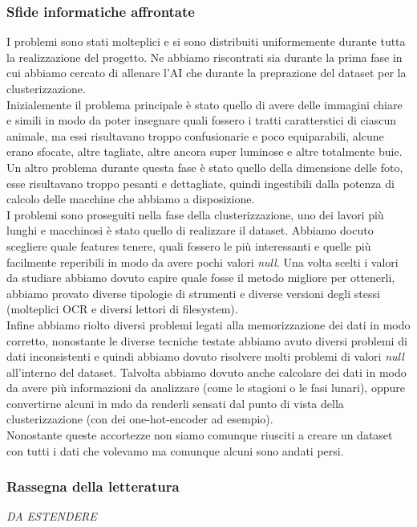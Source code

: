 \documentclass[12pt,a4paper,twoside]{article}
\begin{document}
\subsubsection{Sfide informatiche affrontate}
I problemi sono stati molteplici e si sono distribuiti uniformemente durante tutta la realizzazione del 
progetto. Ne abbiamo riscontrati sia durante la prima fase in cui abbiamo cercato di allenare l'AI che 
durante la preprazione del dataset per la clusterizzazione.\\
Inizialemente il problema principale è stato quello di avere delle immagini chiare e simili in modo da 
poter insegnare quali fossero i tratti caratterstici di ciascun animale, ma essi risultavano troppo 
confusionarie e poco equiparabili, alcune erano sfocate, altre tagliate, altre ancora super luminose e 
altre totalmente buie. Un altro problema durante questa fase è stato quello della dimensione delle foto, 
esse risultavano troppo pesanti e dettagliate, quindi ingestibili dalla potenza di calcolo delle macchine 
che abbiamo a disposizione.\\
I problemi sono proseguiti nella fase della clusterizzazione, uno dei lavori più lunghi e macchinosi è 
stato quello di realizzare il dataset. Abbiamo docuto scegliere quale features tenere, quali fossero le 
più interessanti e quelle più facilmente reperibili in modo da avere pochi valori \textit{null}. Una volta 
scelti i valori da studiare abbiamo dovuto capire quale fosse il metodo migliore per ottenerli, abbiamo 
provato diverse tipologie di strumenti e diverse versioni degli stessi (molteplici OCR e diversi lettori 
di filesystem).\\
Infine abbiamo riolto diversi problemi legati alla memorizzazione dei dati in modo corretto, nonostante 
le diverse tecniche testate abbiamo avuto diversi problemi di dati inconsistenti e quindi abbiamo dovuto 
risolvere molti problemi di valori \textit{null} all'interno del dataset. Talvolta abbiamo dovuto anche 
calcolare dei dati in modo da avere più informazioni da analizzare (come le stagioni o le fasi lunari), 
oppure convertirne alcuni in mdo da renderli sensati dal punto di vista della clusterizzazione (con dei 
one-hot-encoder ad esempio).\\
Nonostante queste accortezze non siamo comunque riusciti a creare un dataset con tutti i dati che volevamo 
ma comunque alcuni sono andati persi.
\subsubsection{Rassegna della letteratura}
\textit{DA ESTENDERE}
\end{document}
